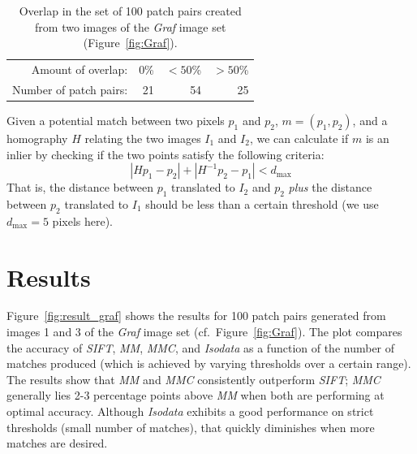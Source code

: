 \documentclass[conference]{IEEEtran}
\begin{document}
\begin{table}[htb]
\caption{Overlap in the set of 100 patch pairs created from two images of the \emph{Graf} image set (Figure~\ref{fig:Graf}).}
\label{table:overlap}
	\centering
\begin{tabular}{r*{3}{r}}
\hline
	Amount of overlap: & 0\% & $< 50$\% & $> 50$\%  \\
	\noalign{\smallskip}
	Number of patch pairs: & 21 & 54 & 25 \\
	\hline
\end{tabular}
\end{table}


Given a potential match between two pixels $p_1$ and 
$p_2$, $m = \left(p_1, p_2\right)$, and a homography $H$ relating the two images $I_1$ and $I_2$, we 
can calculate if $m$ is an inlier by checking if the two points satisfy the following criteria:
\begin{equation*}
\left\vert H p_1 - p_2 \right\vert + \left\vert H^{-1}p_2 - p_1 \right\vert < d_{\max}
\end{equation*}
That is, the distance between $p_1$ translated to $I_2$ and $p_2$ 
\emph{plus} the distance between $p_2$ translated to $I_1$ should be 
less than a certain threshold (we use $d_{\max}=5$ pixels here).


\section{Results}
\label{S:Results}

Figure~\ref{fig:result_graf} shows the results for 100 patch pairs 
generated from images 1 and 3 of the \emph{Graf} image set (cf.~Figure~\ref{fig:Graf}). The plot 
compares the accuracy of \emph{SIFT}, \emph{MM}, \emph{MMC}, and 
\emph{Isodata} as a function of the number of matches produced (which is achieved by varying thresholds over a certain range). The results show that \emph{MM} and \emph{MMC} consistently outperform \emph{SIFT}; \emph{MMC} generally lies 2-3 percentage points above \emph{MM} when both are performing at optimal accuracy. 
Although \emph{Isodata} exhibits a good performance on strict thresholds (small number of matches), that quickly diminishes when more matches are desired.
\end{document}

